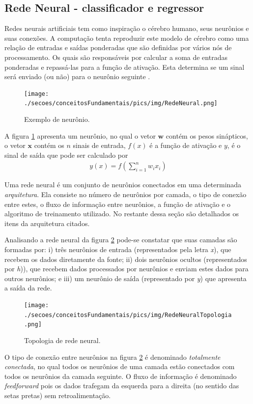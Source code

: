 \subsection{Rede Neural - classificador e regressor}
Redes neurais artificiais tem como inspiração o cérebro humano, seus neurônios e suas conexões. A computação tenta reproduzir este modelo de cérebro como uma relação de entradas e saídas ponderadas que são definidas por vários nós de processamento. Os quais são responsáveis por calcular a soma de entradas ponderadas e repassá-las para a função de ativação. Esta determina se um sinal será enviado (ou não) para o neurônio seguinte \cite{Haykin2007}.
\begin{figure}[hbt]
	\centering
 	\caption{Exemplo de neurônio.}
	\texttt{[image: ./secoes/conceitosFundamentais/pics/img/RedeNeural.png]}
	\label{FIGURA_REDE_NEURAL_NEURONIO}
\end{figure}
A figura \ref{FIGURA_REDE_NEURAL_NEURONIO} apresenta um neurônio, no qual o vetor \(\mathbf{w}\) contém os pesos sinápticos, o vetor \(\mathbf{x}\) contém os \(n\) sinais de entrada, \(f(x)\) é a função de ativação e \(y\), é o sinal de saída que pode ser calculado por
\begin{align}
y(x) = f \left( \sum\limits_{i=1}^{n} w_{i}x_{i} \right)
\end{align}

Uma rede neural é um conjunto de neurônios conectados em uma determinada \emph{arquitetura}. Ela consiste no número de neurônios por camada, o tipo de conexão entre estes, o fluxo de informação entre neurônios, a função de ativação e o algoritmo de treinamento utilizado. No restante dessa seção são detalhados os itens da arquitetura citados.

Analisando a rede neural da figura \ref{FIGURA_REDE_NEURAL_TOPOLOGIA} pode-se constatar que suas camadas são formadas por: i) três neurônios de entrada (representados pela letra \emph{x}), que recebem os dados diretamente da fonte; ii) dois neurônios ocultos (representados por \emph{h})), que recebem dados processados por neurônios e enviam estes dados para outros neurônios; e iii) um neurônio de saída (representado por \emph{y}) que apresenta a saída da rede.
\begin{figure}[hbt]
	\centering
 	  \caption{Topologia de rede neural.}
		\texttt{[image: ./secoes/conceitosFundamentais/pics/img/RedeNeuralTopologia.png]}
	\label{FIGURA_REDE_NEURAL_TOPOLOGIA}
\end{figure}
O tipo de conexão entre neurônios na figura \ref{FIGURA_REDE_NEURAL_TOPOLOGIA} é denominado \emph{totalmente conectada}, no qual todos os neurônios de uma camada estão conectados com todos os neurônios da camada seguinte. O fluxo de informação é denominado \emph{feedforward} pois os dados trafegam da esquerda para a direita (no sentido das setas pretas) sem retroalimentação.

